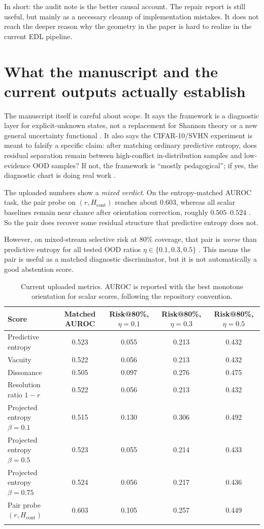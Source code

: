 \documentclass[11pt]{article}
\begin{document}
In short: the audit note is the better causal account. The repair report is still useful, but mainly as a necessary cleanup of implementation mistakes. It does not reach the deeper reason why the geometry in the paper is hard to realize in the current EDL pipeline.

\section{What the manuscript and the current outputs actually establish}

The manuscript itself is careful about scope. It says the framework is a diagnostic layer for explicit-unknown states, not a replacement for Shannon theory or a new general uncertainty functional \cite{draft}. It also says the CIFAR-10/SVHN experiment is meant to falsify a specific claim: after matching ordinary predictive entropy, does residual separation remain between high-conflict in-distribution samples and low-evidence OOD samples? If not, the framework is ``mostly pedagogical''; if yes, the diagnostic chart is doing real work \cite{draft}.

The uploaded numbers show a \emph{mixed verdict}. On the entropy-matched AUROC task, the pair probe on $(r,H_{\mathrm{cont}})$ reaches about $0.603$, whereas all scalar baselines remain near chance after orientation correction, roughly $0.505$--$0.524$ \cite{csv-auroc}. So the pair does recover some residual structure that predictive entropy does not.

However, on mixed-stream selective risk at $80\%$ coverage, that pair is \emph{worse} than predictive entropy for all tested OOD ratios $\eta \in \{0.1,0.3,0.5\}$ \cite{csv-risk}. This means the pair is useful as a matched diagnostic discriminator, but it is not automatically a good abstention score.

\begin{table}[t]
\centering
\small
\caption{Current uploaded metrics. AUROC is reported with the best monotone orientation for scalar scores, following the repository convention.}
\begin{tabular}{lcccc}
\toprule
\textbf{Score} & \textbf{Matched AUROC} & \textbf{Risk@80\%, $\eta=0.1$} & \textbf{Risk@80\%, $\eta=0.3$} & \textbf{Risk@80\%, $\eta=0.5$} \\
\midrule
Predictive entropy & 0.523 & 0.055 & 0.213 & 0.432 \\
Vacuity & 0.522 & 0.056 & 0.213 & 0.432 \\
Dissonance & 0.505 & 0.097 & 0.276 & 0.475 \\
Resolution ratio $1-r$ & 0.522 & 0.056 & 0.213 & 0.432 \\
Projected entropy $\beta=0.1$ & 0.515 & 0.130 & 0.306 & 0.492 \\
Projected entropy $\beta=0.5$ & 0.523 & 0.055 & 0.214 & 0.433 \\
Projected entropy $\beta=0.75$ & 0.524 & 0.056 & 0.217 & 0.436 \\
Pair probe $(r,H_{\mathrm{cont}})$ & 0.603 & 0.105 & 0.257 & 0.449 \\
\\
\bottomrule
\end{tabular}
\end{table}
\end{document}
